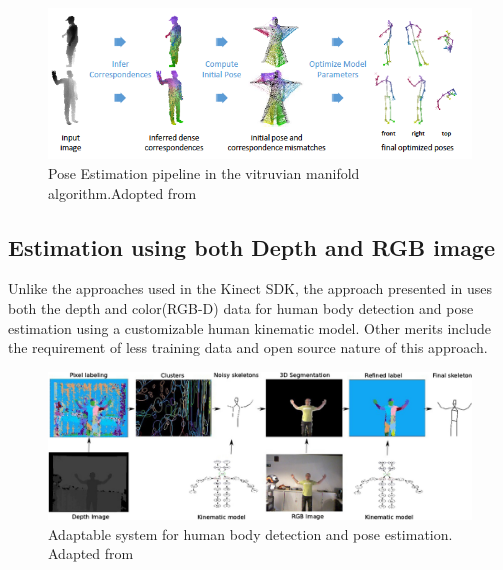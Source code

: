 \begin{figure}[H]
\centering
\includegraphics[width=\textwidth]{assets/vitruvian_manifold.png}
\caption[Pose Estimation pipeline in the vitruvian manifold algorithm]{Pose Estimation pipeline in the vitruvian manifold algorithm.{Adopted from \cite{taylor2012vitruvian}}}
\label{fig:vitruvian}
\end{figure}

\subsection{Estimation using both Depth and RGB image}
Unlike the approaches used in the Kinect SDK, the approach presented in \cite{buys2014adaptable} uses both the depth and color(RGB-D) data for human body detection and pose estimation using a customizable human kinematic model. Other merits include the requirement of less training data and open source nature of this approach. 
\begin{figure}[H]
\centering
\includegraphics[width=\textwidth]{assets/adaptable_system_rgbd.png}
\caption[Adaptable system for human body detection and pose estimation]{Adaptable system for human body detection and pose estimation. {Adapted from \cite{buys2014adaptable}}}
\label{fig:adaptable_rgbd}
\end{figure}

